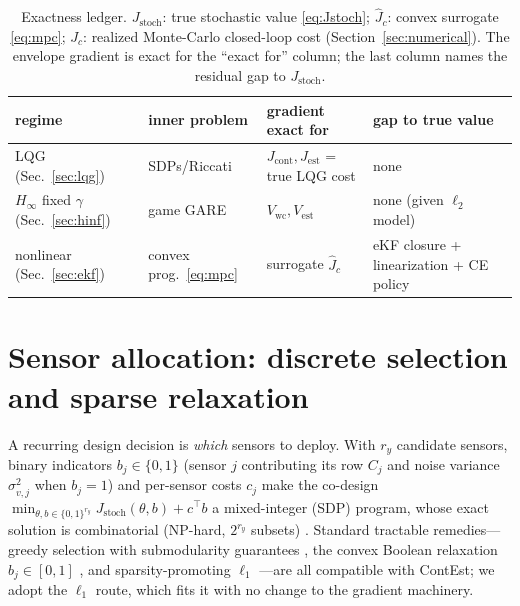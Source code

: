 \documentclass[twocolumn,amsthm]{autart}
\begin{document}
\begin{table}[t]
\centering
\caption{Exactness ledger. $J_{\mathrm{stoch}}$: true stochastic value
\eqref{eq:Jstoch}; $\widehat J_c$: convex surrogate \eqref{eq:mpc}; $J_c$:
realized Monte-Carlo closed-loop cost (Section~\ref{sec:numerical}). The envelope
gradient is exact for the ``exact for'' column; the last column names the residual
gap to $J_{\mathrm{stoch}}$.}
\label{tab:ledger}
\small
\begin{tabular}{@{}p{1.75cm}p{1.55cm}p{1.55cm}p{1.9cm}@{}}
\toprule
regime & inner problem & gradient exact for & gap to true value\\
\midrule
LQG (Sec.~\ref{sec:lqg}) & SDPs/Riccati & $J_{\mathrm{cont}},J_{\mathrm{est}}$ = true LQG cost & none\\
$H_\infty$ fixed $\gamma$ (Sec.~\ref{sec:hinf}) & game GARE & $V_{\mathrm{wc}},V_{\mathrm{est}}$ & none (given $\ell_2$ model)\\
nonlinear (Sec.~\ref{sec:ekf}) & convex prog.~\eqref{eq:mpc} & surrogate $\widehat J_c$ & eKF closure + linearization + CE policy\\
\bottomrule
\end{tabular}
\end{table}

\section{Sensor allocation: discrete selection and sparse relaxation}
\label{sec:sensor}

A recurring design decision is \emph{which} sensors to deploy. With $r_y$
candidate sensors, binary indicators $b_j\in\{0,1\}$ (sensor $j$ contributing its
row $C_j$ and noise variance $\sigma_{v,j}^2$ when $b_j=1$) and per-sensor costs
$c_j$ make the co-design $\min_{\theta,b\in\{0,1\}^{r_y}}
J_{\mathrm{stoch}}(\theta,b)+c^\top b$ a mixed-integer (SDP) program, whose exact
solution is combinatorial (NP-hard, $2^{r_y}$ subsets)
\cite{joshi2009sensor,tzoumas2016sensor}. Standard tractable remedies---greedy
selection with submodularity guarantees \cite{tzoumas2016sensor,zhang2017sensor},
the convex Boolean relaxation $b_j\in[0,1]$ \cite{joshi2009sensor}, and
sparsity-promoting $\ell_1$ \cite{dhingra2014admm,saraf2017h2,das2017sparse}---are
all compatible with ContEst; we adopt the $\ell_1$ route, which fits it with no
change to the gradient machinery.
\end{document}
